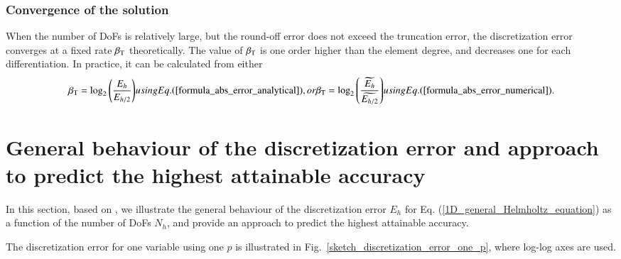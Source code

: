 \documentclass[review,3p]{elsarticle}
\makeatletter
\newcommand*{\rom}[1]{\expandafter\@slowromancap\romannumeral #1@}
\makeatother
\begin{document}
\subsubsection{Convergence of the solution}

When the number of DoFs is relatively large, but the round-off error does not exceed the truncation error, the discretization error converges at a fixed rate $\beta_{\rm T}$ theoretically\cite[Theorem~5.\rom{1}]{gockenbach2006understanding}. The value of $\beta_{\rm T}$ is one order higher than the element degree, and decreases one for each differentiation. In practice, it can be calculated from either 
\begin{subequations}	\label{formula_order_of_convergence}
\begin{align}
 \beta_{\rm T}=\log _2 \left( \frac{E_{h}}{E_{h/2}} \right)
\end{align}
using Eq. (\ref{formula_abs_error_analytical}), or
\begin{align}
 \beta_{\rm T}=\log _2 \left( \frac{\widetilde {E_{h}}}{\widetilde {E_{h/2}}} \right)		\label{formula_order_of_convergence_finer_solution}
\end{align}
using Eq. (\ref{formula_abs_error_numerical}).
\end{subequations}

\newpage

\section{General behaviour of the discretization error and approach to predict the highest attainable accuracy}      \label{section_behaviour_discretization_error_and_prediction}

In this section, based on \cite{Babuska2018Roundoff,WalterFrei}, we illustrate the general behaviour of the discretization error $E_h$  for Eq. (\ref{1D_general_Helmholtz_equation}) as a function of the number of DoFs $N_h$, and provide an approach to predict the highest attainable accuracy.


The discretization error for one variable using one $p$ is illustrated in Fig.~\ref{sketch_discretization_error_one_p}, where log-log axes are used. 
\end{document}
